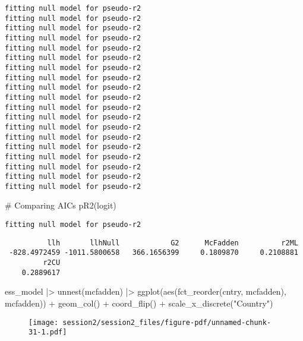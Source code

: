 \documentclass[
  letterpaper,
  DIV=11,
  numbers=noendperiod]{scrreprt}
\newenvironment{Shaded}{\begin{snugshade}}{\end{snugshade}}
\newcommand{\CommentTok}[1]{\textcolor[rgb]{0.37,0.37,0.37}{#1}}
\newcommand{\FunctionTok}[1]{\textcolor[rgb]{0.28,0.35,0.67}{#1}}
\newcommand{\NormalTok}[1]{\textcolor[rgb]{0.00,0.23,0.31}{#1}}
\newcommand{\SpecialCharTok}[1]{\textcolor[rgb]{0.37,0.37,0.37}{#1}}
\newcommand{\StringTok}[1]{\textcolor[rgb]{0.13,0.47,0.30}{#1}}
\begin{document}
\begin{verbatim}
fitting null model for pseudo-r2
fitting null model for pseudo-r2
fitting null model for pseudo-r2
fitting null model for pseudo-r2
fitting null model for pseudo-r2
fitting null model for pseudo-r2
fitting null model for pseudo-r2
fitting null model for pseudo-r2
fitting null model for pseudo-r2
fitting null model for pseudo-r2
fitting null model for pseudo-r2
fitting null model for pseudo-r2
fitting null model for pseudo-r2
fitting null model for pseudo-r2
fitting null model for pseudo-r2
fitting null model for pseudo-r2
fitting null model for pseudo-r2
fitting null model for pseudo-r2
fitting null model for pseudo-r2
\end{verbatim}

\begin{Shaded}
\begin{Highlighting}[]
\CommentTok{\# Comparing AICs}
\FunctionTok{pR2}\NormalTok{(logit)}
\end{Highlighting}
\end{Shaded}

\begin{verbatim}
fitting null model for pseudo-r2
\end{verbatim}

\begin{verbatim}
          llh       llhNull            G2      McFadden          r2ML 
 -828.4972459 -1011.5800658   366.1656399     0.1809870     0.2108881 
         r2CU 
    0.2889617 
\end{verbatim}

\begin{Shaded}
\begin{Highlighting}[]
\NormalTok{ess\_model }\SpecialCharTok{|\textgreater{}} 
    \FunctionTok{unnest}\NormalTok{(mcfadden) }\SpecialCharTok{|\textgreater{}}
    \FunctionTok{ggplot}\NormalTok{(}\FunctionTok{aes}\NormalTok{(}\FunctionTok{fct\_reorder}\NormalTok{(cntry, mcfadden), mcfadden)) }\SpecialCharTok{+} 
    \FunctionTok{geom\_col}\NormalTok{() }\SpecialCharTok{+} \FunctionTok{coord\_flip}\NormalTok{() }\SpecialCharTok{+}
    \FunctionTok{scale\_x\_discrete}\NormalTok{(}\StringTok{"Country"}\NormalTok{)}
\end{Highlighting}
\end{Shaded}

\begin{figure}[H]

{\centering \texttt{[image: session2/session2\_files/figure-pdf/unnamed-chunk-31-1.pdf]}

}

\end{figure}
\end{document}
